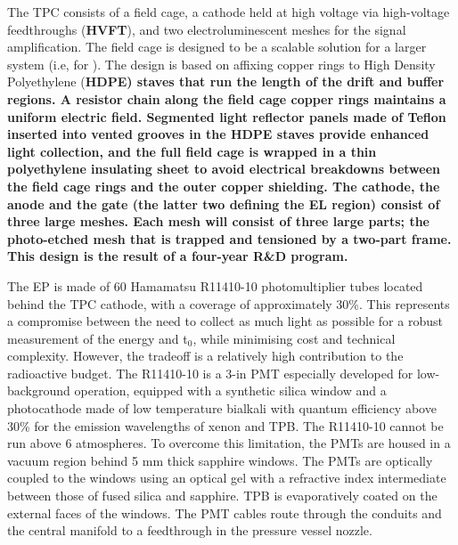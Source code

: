 The TPC consists of a field cage, a cathode held at high voltage via high-voltage feedthroughs ({\bf HVFT}), and two electroluminescent meshes for the signal amplification.
The field cage is designed to be a scalable solution for a larger system (i.e, for \NHD).  The design is based on affixing copper rings to High Density Polyethylene (\bf HDPE) staves that run the length of the drift and buffer regions.  
A resistor chain along the field cage copper rings maintains a uniform electric field. Segmented light reflector panels made of Teflon inserted into vented grooves in the HDPE staves provide enhanced light collection, and the full field cage is wrapped in a thin polyethylene insulating sheet to avoid electrical breakdowns between the field cage rings and the outer copper shielding.
The cathode, the anode and the gate (the latter two defining the EL region) consist of three large meshes.  Each mesh will consist of three large parts; the photo-etched mesh that is trapped and tensioned by a two-part frame. This design is the result of a four-year R\&D program.

\indent

The EP is made of 60 Hamamatsu R11410-10 photomultiplier tubes located behind the TPC cathode, with a coverage of approximately 30\%. This represents a compromise between the need to collect as much light as possible for a robust measurement of the energy and t$_0$, while minimising cost and technical complexity. However, the tradeoff is a relatively high contribution to the radioactive budget. The R11410-10 is a 3-in PMT especially developed for low-background operation, equipped with a synthetic silica window and a photocathode made of low temperature bialkali with quantum efficiency above 30\% for the emission wavelengths of xenon and TPB.
The R11410-10 cannot be run above 6 atmospheres. To overcome this limitation, the PMTs are housed in a vacuum region behind 5 mm thick sapphire windows. %
The PMTs are optically coupled to the windows using an optical gel with a refractive index intermediate between those of fused silica and sapphire. TPB is evaporatively coated on the external faces of the windows. 
The PMT cables route through the conduits and the central manifold to a feedthrough in the pressure vessel nozzle.  

\indent

